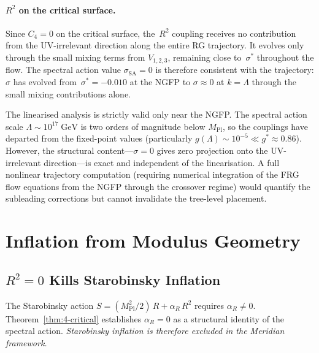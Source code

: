 \paragraph{$R^2$ on the critical surface.}
Since $C_4 = 0$ on the critical surface, the~$R^2$ coupling receives no contribution from the UV-irrelevant direction along the entire RG trajectory. It evolves only through the small mixing terms from $V_{1,2,3}$, remaining close to~$\sigma^*$ throughout the flow. The spectral action value $\sigma_{\mathrm{SA}} = 0$ is therefore consistent with the trajectory: $\sigma$ has evolved from~$\sigma^* = -0.010$ at the NGFP to $\sigma \approx 0$ at $k = \Lambda$ through the small mixing contributions alone.

\begin{remark}
The linearised analysis is strictly valid only near the NGFP. The spectral action scale $\Lambda \sim 10^{17}\;\mathrm{GeV}$ is two orders of magnitude below $M_{\mathrm{Pl}}$, so the couplings have departed from the fixed-point values (particularly $g(\Lambda) \sim 10^{-5} \ll g^* \approx 0.86$). However, the structural content---$\sigma = 0$ gives zero projection onto the UV-irrelevant direction---is exact and independent of the linearisation. A full nonlinear trajectory computation (requiring numerical integration of the FRG flow equations from the NGFP through the crossover regime) would quantify the subleading corrections but cannot invalidate the tree-level placement.
\end{remark}


\section{Inflation from Modulus Geometry}
\label{sec:4-inflation}

\subsection{$R^2 = 0$ Kills Starobinsky Inflation}
\label{sec:4-starobinsky-killed}

The Starobinsky action $S = (M_{\mathrm{Pl}}^2/2)\, R + \alpha_R\, R^2$ requires $\alpha_R \neq 0$. Theorem~\ref{thm:4-critical} establishes $\alpha_R = 0$ as a structural identity of the spectral action. \emph{Starobinsky inflation is therefore excluded in the Meridian framework.}


